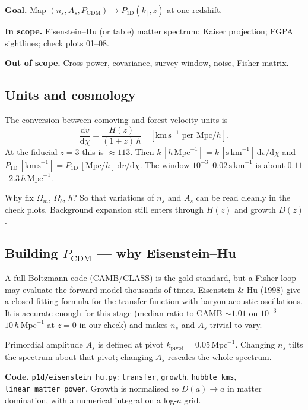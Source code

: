 \documentclass[11pt]{article}
\begin{document}
\textbf{Goal.} Map $(n_s,A_s,P_\mathrm{CDM})\to P_{1\mathrm{D}}(k_\parallel,z)$ at one redshift.

\textbf{In scope.} Eisenstein--Hu (or table) matter spectrum; Kaiser projection; FGPA sightlines; check plots 01--08.

\textbf{Out of scope.} Cross-power, covariance, survey window, noise, Fisher matrix.

\subsection{Units and cosmology}

The conversion between comoving and forest velocity units is
\begin{equation}
\frac{\mathrm{d}v}{\mathrm{d}\chi}=\frac{H(z)}{(1+z)\,h}
\quad[\mathrm{km\,s}^{-1}\text{ per }\mathrm{Mpc}/h].
\end{equation}
At the fiducial $z=3$ this is $\approx 113$.
Then $k\,[h\,\mathrm{Mpc}^{-1}]=k\,[\mathrm{s\,km}^{-1}]\,\mathrm{d}v/\mathrm{d}\chi$ and
$P_{1\mathrm{D}}\,[\mathrm{km\,s}^{-1}]=P_{1\mathrm{D}}\,[\mathrm{Mpc}/h]\,\mathrm{d}v/\mathrm{d}\chi$.
The window $10^{-3}$--$0.02\,\mathrm{s\,km}^{-1}$ is about $0.11$--$2.3\,h\,\mathrm{Mpc}^{-1}$.

Why fix $\Omega_m$, $\Omega_b$, $h$?
So that variations of $n_s$ and $A_s$ can be read cleanly in the check plots.
Background expansion still enters through $H(z)$ and growth $D(z)$.

\subsection{Building $P_\mathrm{CDM}$ --- why Eisenstein--Hu}

A full Boltzmann code (CAMB/CLASS) is the gold standard, but a Fisher loop may evaluate the forward model thousands of times.
Eisenstein \& Hu (1998) give a closed fitting formula for the transfer function with baryon acoustic oscillations.
It is accurate enough for this stage (median ratio to CAMB $\sim 1.01$ on $10^{-3}$--$10\,h\,\mathrm{Mpc}^{-1}$ at $z=0$ in our check) and makes $n_s$ and $A_s$ trivial to vary.

Primordial amplitude $A_s$ is defined at pivot $k_\mathrm{pivot}=0.05\,\mathrm{Mpc}^{-1}$.
Changing $n_s$ tilts the spectrum about that pivot; changing $A_s$ rescales the whole spectrum.

\textbf{Code.}
\texttt{p1d/eisenstein\_hu.py}:
\texttt{transfer}, \texttt{growth}, \texttt{hubble\_kms}, \texttt{linear\_matter\_power}.
Growth is normalised so $D(a)\to a$ in matter domination, with a numerical integral on a log-$a$ grid.
\end{document}

